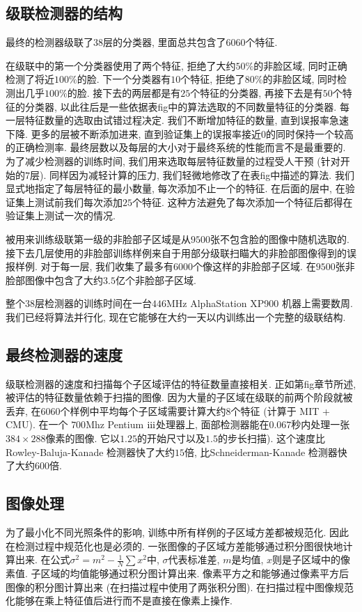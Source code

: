\documentclass[a4paper,utf8,11pt, onecolumn]{ctexart}
\newcommand{\RN}[1]{%
  \textup{\uppercase\expandafter{\romannumeral#1}}%
}
\begin{document}
\subsection{级联检测器的结构}
最终的检测器级联了$38$层的分类器, 里面总共包含了$6060$个特征.

在级联中的第一个分类器使用了两个特征, 拒绝了大约$50\%$的非脸区域, 同时正确检测了将近$100\%$的脸. 下一个分类器有$10$个特征, 拒绝了$80\%$的非脸区域, 同时检测出几乎$100\%$的脸.
接下去的两层都是有$25$个特征的分类器, 再接下去是有$50$个特征的分类器, 以此往后是一些依据表fig中的算法选取的不同数量特征的分类器. 每一层特征数量的选取由试错过程决定. 我们不断增加特征的数量, 直到误报率急速下降. 更多的层被不断添加进来, 直到验证集上的误报率接近$0$的同时保持一个较高的正确检测率. 最终层数以及每层的大小对于最终系统的性能而言不是最重要的.
为了减少检测器的训练时间, 我们用来选取每层特征数量的过程受人干预 (针对开始的$7$层). 同样因为减轻计算的压力, 我们轻微地修改了在表fig中描述的算法. 我们显式地指定了每层特征的最小数量, 每次添加不止一个的特征. 在后面的层中, 在验证集上测试前我们每次添加$25$个特征.
这种方法避免了每次添加一个特征后都得在验证集上测试一次的情况.

被用来训练级联第一级的非脸部子区域是从$9500$张不包含脸的图像中随机选取的. 接下去几层使用的非脸部训练样例来自于用部分级联扫瞄大的非脸部图像得到的误报样例. 对于每一层, 我们收集了最多有$6000$个像这样的非脸部子区域. 在$9500$张非脸部图像中包含了大约$3.5$亿个非脸部子区域.

整个$38$层检测器的训练时间在一台$446$MHz AlphaStation XP900 机器上需要数周. 我们已经将算法并行化, 现在它能够在大约一天以内训练出一个完整的级联结构.

\subsection{最终检测器的速度}
级联检测器的速度和扫描每个子区域评估的特征数量直接相关. 正如第fig章节所述, 被评估的特征数量依赖于扫描的图像. 因为大量的子区域在级联的前两个阶段就被丢弃, 在$6060$个样例中平均每个子区域需要计算大约$8$个特征 (计算于 MIT + CMU\citep{rowley1998neural}). 在一个 $700$Mhz Pentium $\RN{3}$处理器上, 面部检测器能在$0.067$秒内处理一张$384\times288$像素的图像. 它以$1.25$的开始尺寸以及$1.5$的步长扫描). 这个速度比 Rowley-Baluja-Kanade 检测器\citep{rowley1998neural}快了大约$15$倍, 比Schneiderman-Kanade 检测器\citet{schneiderman2000statistical}快了大约$600$倍.

\subsection{图像处理}
为了最小化不同光照条件的影响, 训练中所有样例的子区域方差都被规范化. 因此在检测过程中规范化也是必须的. 一张图像的子区域方差能够通过积分图很快地计算出来. 在公式$\sigma^2=m^2-\frac1N\sum x^2$中, $\sigma$代表标准差, $m$是均值, $x$则是子区域中的像素值. 子区域的均值能够通过积分图计算出来. 像素平方之和能够通过像素平方后图像的积分图计算出来 (在扫描过程中使用了两张积分图).
在扫描过程中图像规范化能够在乘上特征值后进行而不是直接在像素上操作.
\end{document}
